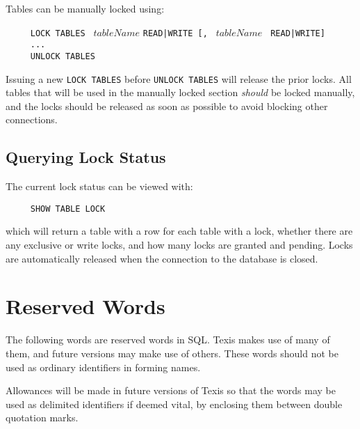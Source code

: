 Tables can be manually locked using:

\verb`     LOCK TABLES ` $tableName$ \verb`READ|WRITE [, ` $tableName$ \verb` READ|WRITE]`\\
\verb`     ...`\\
\verb`     UNLOCK TABLES`

Issuing a new \verb`LOCK TABLES` before \verb`UNLOCK TABLES` will release the prior locks.
All tables that will be used in the manually locked section \emph{should} be locked manually,
and the locks should be released as soon as possible to avoid blocking other connections.

\subsection{Querying Lock Status}

The current lock status can be viewed with:

\verb`     SHOW TABLE LOCK`

which will return a table with a row for each table with a lock, whether there are any
exclusive or write locks, and how many locks are granted and pending.  Locks are
automatically released when the connection to the database is closed.

\section{Reserved Words}

The following words are reserved words in SQL.  Texis makes use of
many of them, and future versions may make use of others.  These words
should not be used as ordinary identifiers in forming names.

Allowances will be made in future versions of Texis so that the words
may be used as delimited identifiers if deemed vital, by enclosing
them between double quotation marks.

